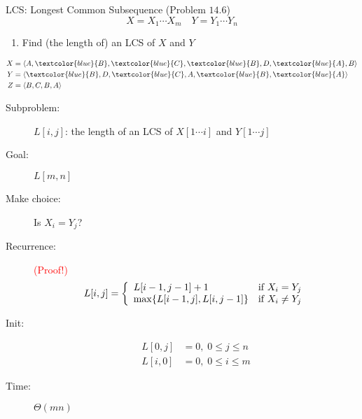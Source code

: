 
\begin{frame}{}
  \centerline{}
\end{frame}

\begin{frame}{}
  \begin{exampleblock}{LCS: Longest Common Subsequence (Problem $14.6$)}
    \[
      X = X_{1} \cdots X_{m} \quad Y = Y_{1} \cdots Y_{n}
    \]

    \begin{enumerate}[(1)]
      \item Find (the length of) an LCS of $X$ and $Y$
    \end{enumerate}
  \end{exampleblock}

  \begin{align*}
    X &= \langle A,\textcolor{blue}{B},\textcolor{blue}{C},\textcolor{blue}{B},D,\textcolor{blue}{A},B \rangle  \\
    Y &= \langle \textcolor{blue}{B},D,\textcolor{blue}{C},A,\textcolor{blue}{B},\textcolor{blue}{A} \rangle \\
    Z &= \langle B,C,B,A \rangle
  \end{align*}
\end{frame}
\begin{frame}{}
  \begin{description}
    \item[Subproblem:] $L[i,j]$: the length of an LCS of $X[1 \cdots i]$ and $Y[1 \cdots j]$
    \item[Goal:] $L[m,n]$
      \pause
    \item[Make choice:] Is $X_{i} = Y_{j}$?
    \item[Recurrence:] \textcolor{red}{(Proof!)}
      \begin{displaymath}
	L[i,j] = \left\{ \begin{array}{ll}
	  L[i-1, j-1] + 1 & \textrm{if $X_{i} = Y_{j}$}\\
	  \max \{L[i-1,j], L[i,j-1]\} & \textrm{if $X_{i} \neq Y_{j}$}
	\end{array} \right.
      \end{displaymath}
      \pause
    \item[Init:]
      \begin{align*}
	L[0,j] &= 0, \; 0 \le j \le n \\
	L[i,0] &= 0, \; 0 \le i \le m 
      \end{align*}
    \item[Time:] $\Theta(mn)$
  \end{description}
\end{frame}
